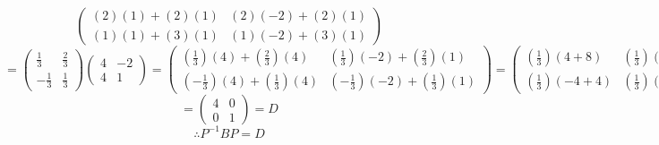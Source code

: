 \begin{itemize}
\begin{itemize}
\[\begin{pmatrix}
(2)(1)+(2)(1) &(2)(-2)+(2)(1)\\
(1)(1)+(3)(1) &(1)(-2)+(3)(1)
\end{pmatrix}\]\[=\begin{pmatrix}\frac{1}{3}&\frac{2}{3}\\-\frac{1}{3}&\frac{1}{3}\end{pmatrix}\begin{pmatrix}
4 &-2\\
4 &1
\end{pmatrix}=\begin{pmatrix}\left(\frac{1}{3}\right)(4)+\left(\frac{2}{3}\right)(4)&\left(\frac{1}{3}\right)(-2)+\left(\frac{2}{3}\right)(1)\\\left(-\frac{1}{3}\right)(4)+\left(\frac{1}{3}\right)(4)&\left(-\frac{1}{3}\right)(-2)+\left(\frac{1}{3}\right)(1)\end{pmatrix}=\begin{pmatrix}\left(\frac{1}{3}\right)(4+8)&\left(\frac{1}{3}\right)(-2+2)\\\left(\frac{1}{3}\right)(-4+4)&\left(\frac{1}{3}\right)(2+1)\end{pmatrix}\]\[=\begin{pmatrix}
4 &0\\
0 &1
\end{pmatrix}=D\]
\[\therefore P^{-1}BP=D\]

    \end{itemize}
    
    
\end{itemize}